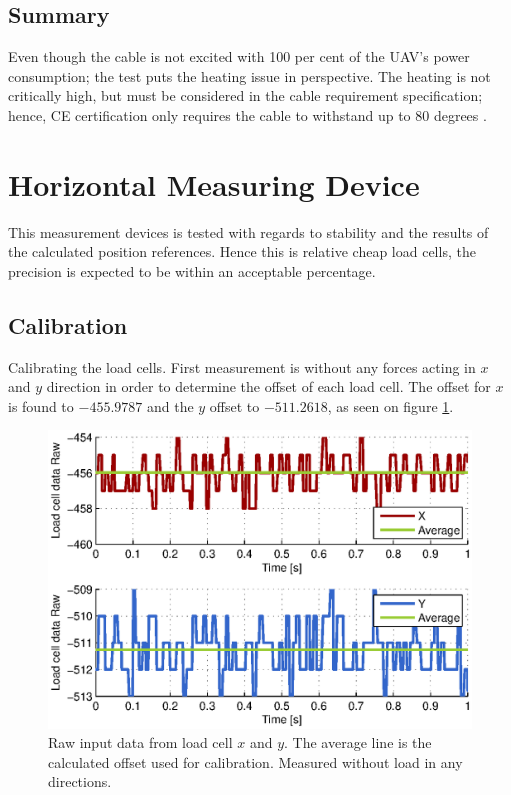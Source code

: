 \subsection{Summary}
Even though the cable is not excited with 100 per cent of the UAV's power consumption; the test puts the heating issue in perspective. The heating is not critically high, but must be considered in the cable requirement specification; hence, CE certification only requires the cable to withstand up to 80 degrees \cite{Parliament2006}.    



\section{Horizontal Measuring Device}
This measurement devices is tested with regards to stability and the results of the calculated position references. Hence this is relative cheap load cells, the precision is expected to be within an acceptable percentage.

\subsection{Calibration}
Calibrating the load cells. First measurement is without any forces acting in $x$ and $y$ direction in order to determine the offset of each load cell.
The offset for $x$ is found to $-455.9787$ and the $y$ offset to $-511.2618$, as seen on figure \ref{fig:HMDcalib}.\\

\begin{figure}[hbtp]
\centering
\includegraphics[scale=1]{graphics/gcs_test/calib_0_data_raw.eps}
\caption[Raw data from load cell, GCS]{Raw input data from load cell $x$ and $y$. The average line is the calculated offset used for calibration. Measured without load in any directions.}
\label{fig:HMDcalib}
\end{figure}

